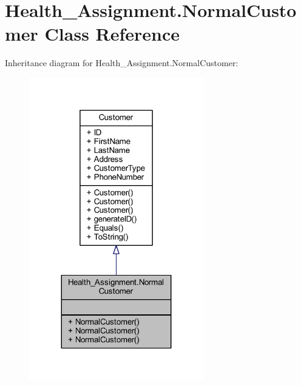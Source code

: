 \hypertarget{class_health___assignment_1_1_normal_customer}{}\section{Health\+\_\+\+Assignment.\+Normal\+Customer Class Reference}
\label{class_health___assignment_1_1_normal_customer}


Inheritance diagram for Health\+\_\+\+Assignment.\+Normal\+Customer\+:\nopagebreak
\begin{figure}[H]
\begin{center}
\leavevmode
\includegraphics[width=215pt]{class_health___assignment_1_1_normal_customer__inherit__graph}
\end{center}
\end{figure}


